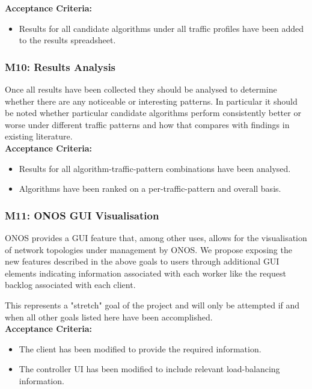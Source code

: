 \textbf{Acceptance Criteria:}
\begin{itemize}
    \item Results for all candidate algorithms under all traffic profiles have been added to the results spreadsheet.
\end{itemize}

\subsubsection{M10: Results Analysis}
Once all results have been collected they should be analysed to determine whether there are any noticeable or interesting patterns. In particular it should be noted whether particular candidate algorithms perform consistently better or worse under different traffic patterns and how that compares with findings in existing literature. \\

\textbf{Acceptance Criteria:}
\begin{itemize}
    \item Results for all algorithm-traffic-pattern combinations have been analysed.
    \item Algorithms have been ranked on a per-traffic-pattern and overall basis.
\end{itemize}

\subsubsection{M11: ONOS GUI Visualisation}
ONOS provides a GUI feature that, among other uses, allows for the visualisation of network topologies under management by ONOS. We propose exposing the new features described in the above goals to users through additional GUI elements indicating information associated with each worker like the request backlog associated with each client.

This represents a "stretch" goal of the project and will only be attempted if and when all other goals listed here have been accomplished. \\

\textbf{Acceptance Criteria:}
\begin{itemize}
    \item The client has been modified to provide the required information.
    \item The controller UI has been modified to include relevant load-balancing information.
\end{itemize}